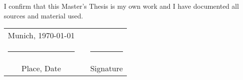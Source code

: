 \vspace*{2\majorheadskip}
I confirm that this Master's Thesis is my own work and I have documented all sources and material used.

\vspace{3cm}

{\def\arraystretch{.7}
\hspace{.75cm}
\begin{tabular}{ccc}
	Munich, \today		&	\hspace{3cm}	& \\
	\rule{4.5cm}{0.4pt}					&					& \rule{4.5cm}{0.4pt}\\
	Place, Date							&					& Signature
\end{tabular}
}


